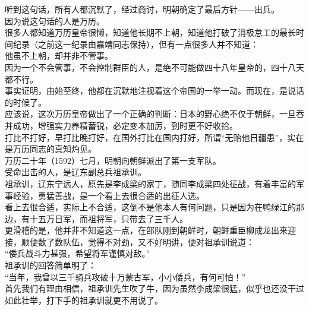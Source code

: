 \begin{multicols}{\theparacolNo}
听到这句话，所有人都沉默了，经过商讨，明朝确定了最后方针——出兵。\\

因为说这句话的人是万历。\\

很多人都知道万历皇帝很懒，知道他长期不上朝，知道他打破了消极怠工的最长时间纪录（之前这一纪录由嘉靖同志保持），但有一点很多人并不知道：\\

他虽不上朝，却并非不管事。\\

因为一个不会管事，不会控制群臣的人，是绝不可能做四十八年皇帝的，四十八天都不行。\\

事实证明，由始至终，他都在沉默地注视着这个帝国的一举一动。而现在，是说话的时候了。\\

应该说，这次万历皇帝做出了一个正确的判断：日本的野心绝不仅于朝鲜，一旦吞并成功，增强实力养精蓄锐，必定变本加厉，到时更不好收拾。\\

打比不打好，早打比晚打好，在国外打比在国内打好，所谓“无贻他日疆患”，实在是万历同志的真知灼见。\\

万历二十年（1592）七月，明朝向朝鲜派出了第一支军队。\\

受命出击的人，是辽东副总兵祖承训。\\

祖承训，辽东宁远人，原先是李成梁的家丁，随同李成梁四处征战，有着丰富的军事经验，勇猛善战，是一个看上去很合适的出征人选。\\

看上去很合适，实际上不合适，这倒不是他本人有何问题，只是因为在鸭绿江的那边，有十五万日军，而祖将军，只带去了三千人。\\

更滑稽的是，他并非不知道这一点，在部队刚到朝鲜时，朝鲜重臣柳成龙出来迎接，顺便数了数队伍，觉得不对劲，又不好明讲，便对祖承训说道：\\

“倭兵战斗力甚强，希望将军谨慎对敌。”\\

祖承训的回答简单明了：\\

“当年，我曾以三千骑兵攻破十万蒙古军，小小倭兵，有何可怕！”\\

首先我们有理由相信，祖承训先生吹了牛，因为虽然李成梁很猛，似乎也还没干过如此壮举，打下手的祖承训就更不用说了。\\


\end{multicols}
